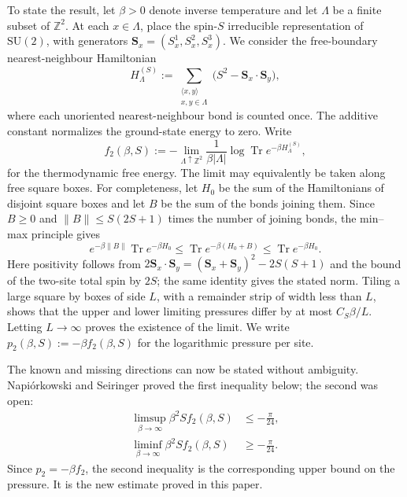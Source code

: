 \documentclass[11pt]{article}
\numberwithin{equation}{section}
\theoremstyle{remark}
\newcommand{\Z}{\mathbb Z}
\newcommand{\Tr}{\operatorname{Tr}}
\newcommand{\1}{\mathbf 1}
\newcommand{\Sp}{\mathbf S}
\begin{document}
To state the result, let \(\beta>0\) denote inverse temperature and let
\(\Lambda\) be a finite subset of \(\Z^2\).  At each \(x\in\Lambda\), place
the spin-\(S\) irreducible representation of
\(\mathrm{SU}(2)\), with
generators \(\Sp_x=(S_x^1,S_x^2,S_x^3)\).  We consider the free-boundary
nearest-neighbour Hamiltonian
\begin{equation}
 H_\Lambda^{(S)}
 :=\sum_{\substack{\langle x,y\rangle\\x,y\in\Lambda}}
 \bigl(S^2-\Sp_x\mathbin\cdot\Sp_y\bigr),
 \label{eq:intro-hamiltonian}
\end{equation}
where each unoriented nearest-neighbour bond is counted once.  The additive
constant normalizes the ground-state energy to zero.  Write
\begin{equation}
 f_2(\beta,S):=-\lim_{\Lambda\uparrow\Z^2}
 \frac1{\beta|\Lambda|}\log\Tr e^{-\beta H_\Lambda^{(S)}}
 \label{eq:intro-free-energy},
\end{equation}
for the thermodynamic free energy.  The limit may equivalently be taken
along free square boxes.  For completeness, let \(H_0\) be the sum of the
Hamiltonians of disjoint square boxes and let \(B\) be the sum of the bonds
joining them.  Since \(B\geq0\) and \(\|B\|\leq S(2S+1)\) times the
number of joining bonds, the min--max principle gives
\[
 e^{-\beta\|B\|}\Tr e^{-\beta H_0}
 \leq \Tr e^{-\beta(H_0+B)}
 \leq \Tr e^{-\beta H_0}.
\]
Here positivity follows from
\(2\Sp_x\cdot\Sp_y=(\Sp_x+\Sp_y)^2-2S(S+1)\) and the bound of the
two-site total spin by \(2S\); the same identity gives the stated norm.
Tiling a large square by boxes of side \(L\), with a remainder strip of
width less than \(L\), shows that the upper and lower limiting pressures
differ by at most \(C_S\beta/L\).  Letting \(L\to\infty\) proves the
existence of the limit.  We write
\(p_2(\beta,S):=-\beta f_2(\beta,S)\) for the logarithmic pressure per
site.

The known and missing directions can now be stated without ambiguity.
Napiórkowski and Seiringer proved the first inequality below; the second
was open:
\begin{align}
 \limsup_{\beta\to\infty}\beta^2S f_2(\beta,S)
 &\leq-\frac\pi{24},
 \label{eq:intro-known-direction}\\
 \liminf_{\beta\to\infty}\beta^2S f_2(\beta,S)
 &\geq-\frac\pi{24}.
 \label{eq:intro-missing-direction}
\end{align}
Since \(p_2=-\beta f_2\), the second inequality is the corresponding upper
bound on the pressure.  It is the new estimate proved in this paper.
\end{document}
